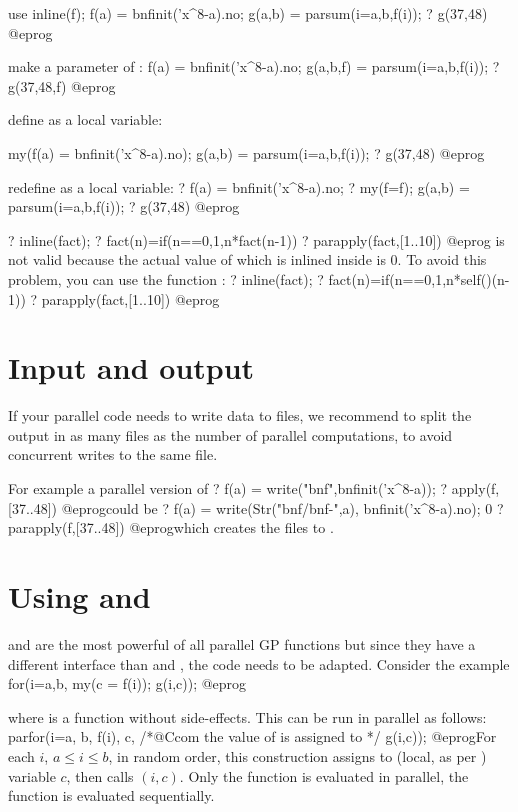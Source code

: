 \item use 
\bprog
inline(f);
f(a) = bnfinit('x^8-a).no;
g(a,b) = parsum(i=a,b,f(i));
? g(37,48)
@eprog

\item make  a parameter of :
\bprog
f(a) = bnfinit('x^8-a).no;
g(a,b,f) = parsum(i=a,b,f(i));
? g(37,48,f)
@eprog

\item define  as a local variable:

\bprog
{
  my(f(a) = bnfinit('x^8-a).no);
  g(a,b) = parsum(i=a,b,f(i));
}
? g(37,48)
@eprog

\item redefine  as a local variable:
\bprog
? f(a) = bnfinit('x^8-a).no;
? my(f=f); g(a,b) = parsum(i=a,b,f(i));
? g(37,48)
@eprog

\bprog
? inline(fact);
? fact(n)=if(n==0,1,n*fact(n-1))
? parapply(fact,[1..10])
@eprog
is not valid because the actual value of  which is inlined inside
 is $0$.  To avoid this problem, you can use the function
:
\bprog
? inline(fact);
? fact(n)=if(n==0,1,n*self()(n-1))
? parapply(fact,[1..10])
@eprog

\section{Input and output}
If your parallel code needs to write data to files, we recommend to split
the output in as many files as the number of parallel computations, to avoid
concurrent writes to the same file.

For example a parallel version of
\bprog
? f(a) = write("bnf",bnfinit('x^8-a));
? apply(f,[37..48])
@eprog\noindent could be
\bprog
? f(a) = write(Str("bnf/bnf-",a), bnfinit('x^8-a).no); 0
? parapply(f,[37..48])
@eprog\noindent which creates the files  to .

\section{Using  and }
 and  are the most powerful of all parallel GP
functions but since they have a different interface than  and
, the code needs to be adapted. Consider the example
\bprog
for(i=a,b,
  my(c = f(i));
  g(i,c));
@eprog\noindent

where  is a function without side-effects.  This can be run in parallel
as follows:
\bprog
parfor(i=a, b,
  f(i),
  c,     /*@Ccom the value of  is assigned to  */
  g(i,c));
@eprog\noindent For each $i$, $a \leq i \leq b$, in random order,
this construction assigns  to (local, as per ) variable
$c$, then calls $(i,c)$. Only the function  is evaluated
in parallel, the function  is evaluated sequentially.

